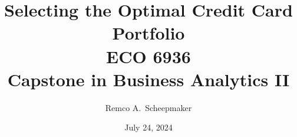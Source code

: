 \documentclass[11pt, letterpaper]{article}
\begin{document}
\doublespacing %

\title{Selecting the Optimal Credit Card Portfolio\\
      {\large ECO 6936}\\
      {\large Capstone in Business Analytics II}}
\author{Remco A.~Scheepmaker}
\date{July 24, 2024}

\maketitle

% 















\end{document}
